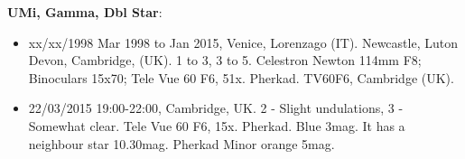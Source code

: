 {\bf UMi, Gamma, Dbl Star}:
\begin{itemize}
\item xx/xx/1998 Mar 1998 to Jan 2015, Venice, Lorenzago (IT). Newcastle, Luton Devon, Cambridge, (UK). 1 to 3, 3 to 5. Celestron Newton 114mm F8; Binoculars 15x70; Tele Vue 60 F6, 51x. Pherkad. TV60F6, Cambridge (UK).
\item 22/03/2015 19:00-22:00, Cambridge, UK. 2 - Slight undulations, 3 - Somewhat clear. Tele Vue 60 F6, 15x. Pherkad. Blue 3mag. It has a neighbour star 10.30mag. Pherkad Minor orange 5mag.
\end{itemize}
